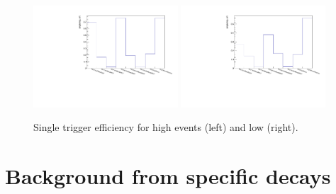 \begin{figure}
\centering
\includegraphics[width=0.48\textwidth]{Lmumu/figs/trig_highq2.pdf}
\includegraphics[width=0.48\textwidth]{Lmumu/figs/trig_lowq2.pdf}
\caption{ Single trigger efficiency for high \qsq events (left) and low \qsq (right). }
\label{fig:trigContrib}
\end{figure}


\section{Background from specific decays}

